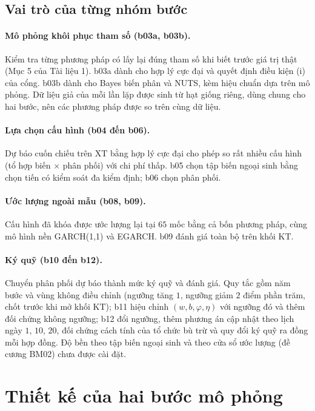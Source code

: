 \documentclass[12pt,a4paper]{article}
\theoremstyle{remark}
\newcommand{\XT}{\mathrm{XT}}
\newcommand{\KT}{\mathrm{KT}}
\begin{document}
\subsection{Vai trò của từng nhóm bước}

\paragraph{Mô phỏng khôi phục tham số (b03a, b03b).} Kiểm tra từng phương pháp có lấy lại đúng tham số khi biết trước giá trị thật (Mục 5 của Tài liệu 1). b03a dành cho hợp lý cực đại và quyết định điều kiện (i) của cổng. b03b dành cho Bayes biến phân và NUTS, kèm hiệu chuẩn dựa trên mô phỏng. Dữ liệu giả của mỗi lần lặp được sinh từ hạt giống riêng, dùng chung cho hai bước, nên các phương pháp được so trên cùng dữ liệu.

\paragraph{Lựa chọn cấu hình (b04 đến b06).} Dự báo cuốn chiếu trên $\XT$ bằng hợp lý cực đại cho phép so rất nhiều cấu hình (tổ hợp biến $\times$ phân phối) với chi phí thấp. b05 chọn tập biến ngoại sinh bằng chọn tiến có kiểm soát đa kiểm định; b06 chọn phân phối.

\paragraph{Ước lượng ngoài mẫu (b08, b09).} Cấu hình đã khóa được ước lượng lại tại $65$ mốc bằng cả bốn phương pháp, cùng mô hình nền GARCH(1,1) và EGARCH. b09 đánh giá toàn bộ trên khối $\KT$.

\paragraph{Ký quỹ (b10 đến b12).} Chuyển phân phối dự báo thành mức ký quỹ và đánh giá. Quy tắc gồm năm bước và vùng không điều chỉnh (ngưỡng tăng $1$, ngưỡng giảm $2$ điểm phần trăm, chốt trước khi mở khối $\KT$); b11 hiệu chỉnh $(w,b,\varphi,\eta)$ với ngưỡng đó và thêm đối chứng không ngưỡng; b12 đổi ngưỡng, thêm phương án cập nhật theo lịch ngày $1$, $10$, $20$, đối chứng cách tính của tổ chức bù trừ và quy đổi ký quỹ ra đồng mỗi hợp đồng. Độ bền theo tập biến ngoại sinh và theo cửa sổ ước lượng (đề cương BM02) chưa được cài đặt.

\section{Thiết kế của hai bước mô phỏng}
\end{document}
